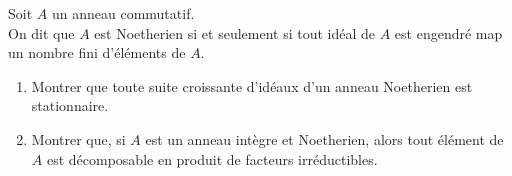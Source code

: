 \begin{exer}
Soit $A$ un anneau commutatif.\\
On dit que $A$ est Noetherien si et seulement si tout idéal de $A$ est engendré map un nombre fini d'éléments de $A$.
\begin{enumerate}
\item Montrer que toute suite croissante d'idéaux d'un anneau Noetherien est stationnaire.
\item Montrer que, si $A$ est un anneau intègre et Noetherien, alors tout élément de $A$ est décomposable en produit de facteurs irréductibles.
\end{enumerate}
\end{exer}
